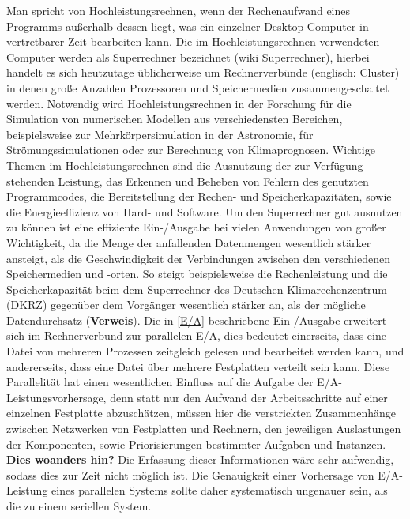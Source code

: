 \documentclass[
	12pt,
	a4paper,
	BCOR10mm,
	DIV14,
	listof=totoc,
	bibliography=totoc,
	headsepline
]{scrreprt}
\begin{document}
Man spricht von Hochleistungsrechnen, wenn der Rechenaufwand eines Programms außerhalb dessen liegt, was ein einzelner Desktop-Computer in vertretbarer Zeit bearbeiten kann.
Die im Hochleistungsrechnen verwendeten Computer werden als Superrechner bezeichnet (wiki Superrechner), hierbei handelt es sich heutzutage üblicherweise um Rechnerverbünde (englisch: Cluster) in denen große Anzahlen Prozessoren und Speichermedien zusammengeschaltet werden.
Notwendig wird Hochleistungsrechnen in der Forschung für die Simulation von numerischen Modellen aus verschiedensten Bereichen, beispielsweise zur Mehrkörpersimulation in der Astronomie, für Strömungssimulationen oder zur Berechnung von Klimaprognosen.
Wichtige Themen im Hochleistungsrechnen sind die Ausnutzung der zur Verfügung stehenden Leistung, das Erkennen und Beheben von Fehlern des genutzten Programmcodes, die Bereitstellung der Rechen- und Speicherkapazitäten, sowie die Energieeffizienz von Hard- und Software.
Um den Superrechner gut ausnutzen zu können ist eine effiziente Ein-/Ausgabe bei vielen Anwendungen von großer Wichtigkeit, da die Menge der anfallenden Datenmengen wesentlich stärker ansteigt, als die Geschwindigkeit der Verbindungen zwischen den verschiedenen Speichermedien und -orten. So steigt beispielsweise die Rechenleistung und die Speicherkapazität beim dem Superrechner des Deutschen Klimarechenzentrum (DKRZ) gegenüber dem Vorgänger wesentlich stärker an, als der mögliche Datendurchsatz (\textbf{Verweis}).
Die in \ref{E/A} beschriebene Ein-/Ausgabe erweitert sich im Rechnerverbund zur parallelen E/A, dies bedeutet einerseits, dass eine Datei von mehreren Prozessen zeitgleich gelesen und bearbeitet werden kann, und andererseits, dass eine Datei über mehrere Festplatten verteilt sein kann. Diese Parallelität hat einen wesentlichen Einfluss auf die Aufgabe der E/A-Leistungsvorhersage, denn statt nur den Aufwand der Arbeitsschritte auf einer einzelnen Festplatte abzuschätzen, müssen hier die verstrickten Zusammenhänge zwischen Netzwerken von Festplatten und Rechnern, den jeweiligen Auslastungen der Komponenten, sowie Priorisierungen bestimmter Aufgaben und Instanzen.\\
\textbf{Dies woanders hin?}
Die Erfassung dieser Informationen wäre sehr aufwendig, sodass dies zur Zeit nicht möglich ist. Die Genauigkeit einer Vorhersage von E/A-Leistung eines parallelen Systems sollte daher systematisch ungenauer sein, als die zu einem seriellen System.


\end{document}
